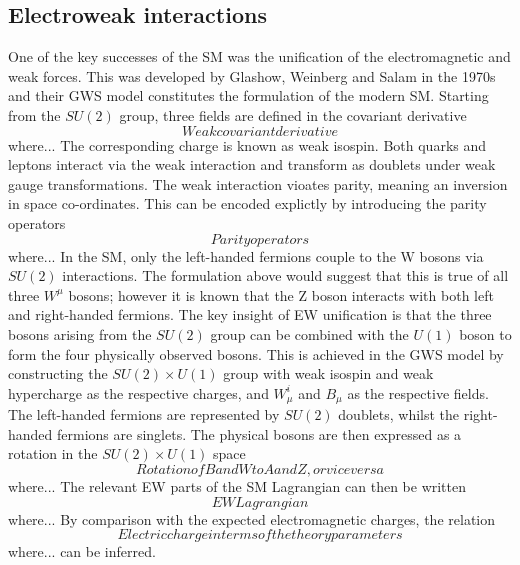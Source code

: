 \subsection{Electroweak interactions}

One of the key successes of the SM was the unification of the electromagnetic and weak forces.
This was developed by Glashow, Weinberg and Salam in the 1970s~\cite{Glashow,Weinberg,Salam} 
and their GWS model constitutes the formulation of the modern SM.
Starting from the $SU(2)$ group, three fields are defined in the covariant derivative
\begin{equation}
Weak covariant derivative
\end{equation}
where... 
The corresponding charge is known as weak isospin. 
Both quarks and leptons interact via the weak interaction 
and transform as doublets under weak gauge transformations.
The weak interaction vioates parity, meaning an inversion in space co-ordinates.
This can be encoded explictly by introducing the parity operators
\begin{equation}
Parity operators
\end{equation}
where... 
In the SM, only the left-handed fermions couple to the W bosons via $SU(2)$ interactions.
The formulation above would suggest that this is true of all three $W^{\mu}$ bosons;
however it is known that the Z boson interacts with both left and right-handed fermions.
The key insight of EW unification is that the three bosons arising from the $SU(2)$ group 
can be combined with the $U(1)$ boson to form the four physically observed bosons.
This is achieved in the GWS model by constructing the $SU(2) \times U(1)$ group 
with weak isospin and weak hypercharge as the respective charges, 
and $W^{i}_{\mu}$ and $B_{\mu}$ as the respective fields.
The left-handed fermions are represented by $SU(2)$ doublets, 
whilst the right-handed fermions are singlets.
The physical bosons are then expressed as a rotation in the $SU(2) \times U(1)$ space
\begin{equation}
Rotation of B and W to A and Z, or vice versa
\end{equation}
where... 
The relevant EW parts of the SM Lagrangian can then be written
\begin{equation}
EW Lagrangian
\end{equation}
where... 
By comparison with the expected electromagnetic charges, the relation 
\begin{equation}
Electric charge in terms of the theory parameters
\end{equation}
where... 
can be inferred.

